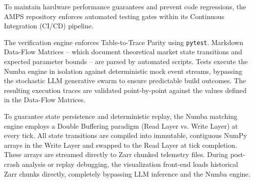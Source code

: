 To maintain hardware performance guarantees and prevent code regressions, the AMPS repository enforces automated testing gates within its Continuous Integration (CI/CD) pipeline.

The verification engine enforces Table-to-Trace Parity using \texttt{pytest}. Markdown Data-Flow Matrices -- which document theoretical market state transitions and expected parameter bounds -- are parsed by automated scripts. Tests execute the Numba engine in isolation against deterministic mock event streams, bypassing the stochastic LLM generative swarm to ensure predictable build outcomes. The resulting execution traces are validated point-by-point against the values defined in the Data-Flow Matrices.

To guarantee state persistence and deterministic replay, the Numba matching engine employs a Double Buffering paradigm (Read Layer vs. Write Layer) at every tick. All state transitions are compiled into immutable, contiguous NumPy arrays in the Write Layer and swapped to the Read Layer at tick completion. These arrays are streamed directly to Zarr chunked telemetry files. During post-crash analysis or replay debugging, the visualization front-end loads historical Zarr chunks directly, completely bypassing LLM inference and the Numba engine.

